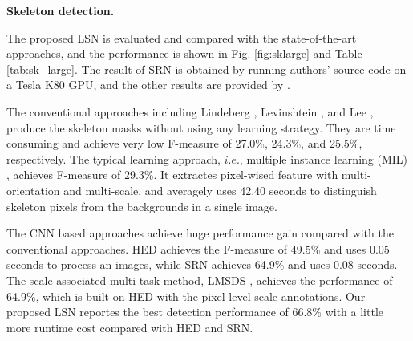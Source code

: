\documentclass[runningheads]{llncs}
\begin{document}
\textbf{Skeleton detection.} 

The proposed LSN is evaluated and compared with the state-of-the-art approaches, and the performance is shown in Fig. \ref{fig:sklarge} and Table \ref{tab:sk_large}. The result of SRN \cite{ref1} is obtained by running authors' source code on a Tesla K80 GPU, and the other results are provided by \cite{ref33}.

The conventional approaches including Lindeberg \cite{ref37}, Levinshtein \cite{ref12}, and Lee \cite{ref13}, produce the skeleton masks without using any learning strategy. They are time consuming and achieve very low F-measure of 27.0\%, 24.3\%, and 25.5\%, respectively. The typical learning approach, $i.e.$, multiple instance learning (MIL) \cite{ref15}, achieves F-measure of 29.3\%. It extractes pixel-wised feature with multi-orientation and multi-scale, and averagely uses 42.40 seconds to distinguish skeleton pixels from the backgrounds in a single image.





The CNN based approaches achieve huge performance gain compared with the conventional approaches. HED \cite{ref6} achieves the F-measure of 49.5\% and uses  0.05 seconds to process an images, while SRN \cite{ref1} achieves 64.9\% and uses 0.08 seconds. The scale-associated multi-task method, LMSDS \cite{ref33}, achieves the performance of 64.9\%, which is built on HED with the pixel-level scale annotations. Our proposed LSN reportes the best detection performance of 66.8\% with a little more runtime cost compared with HED and SRN. 
\end{document}
